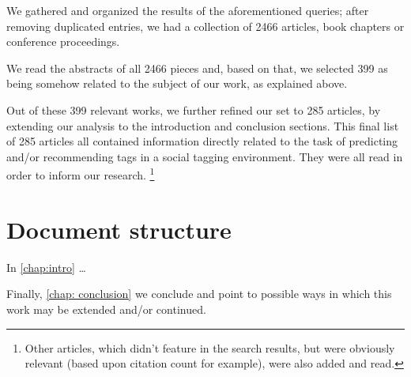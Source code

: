 We gathered and organized the results of the aforementioned queries; after removing duplicated entries, we had a collection of 2466 articles, book chapters or conference proceedings.

We read the abstracts of all 2466 pieces and, based on that, we selected 399 as being somehow related to the subject of our work, as explained above.

Out of these 399 relevant works, we further refined our set to 285 articles, by extending our analysis to the introduction and conclusion sections. This final list of 285 articles all contained information directly related to the task of predicting and/or recommending tags in a social tagging environment. They were all read in order to inform our research. \footnote{Other articles, which didn't feature in the search results, but were obviously relevant (based upon citation count for example), were also added and read.}


\section{Document structure}\label{section:intro_structure}

In \autoref{chap:intro} \ldots

Finally, \autoref{chap: conclusion} we conclude and point to possible ways in which this work may be extended and/or continued.